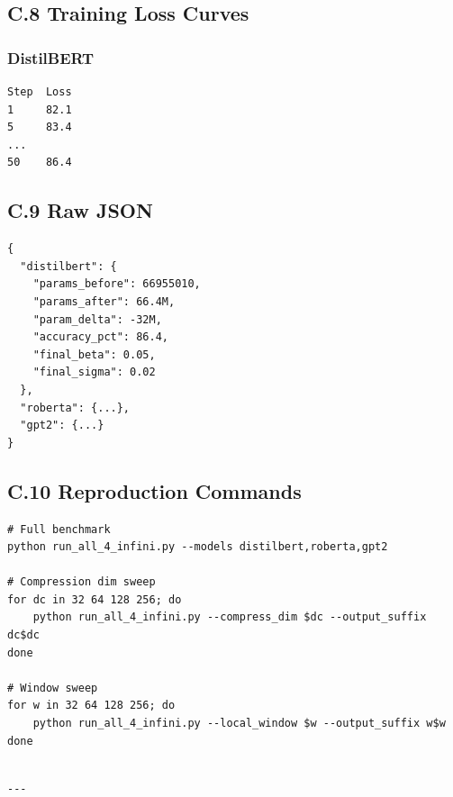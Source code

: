 \subsection{C.8 Training Loss Curves}

\subsubsection{DistilBERT}
\begin{lstlisting}
Step  Loss
1     82.1
5     83.4
...
50    86.4
\end{lstlisting}

\subsection{C.9 Raw JSON}

\begin{lstlisting}
{
  "distilbert": {
    "params_before": 66955010,
    "params_after": 66.4M,
    "param_delta": -32M,
    "accuracy_pct": 86.4,
    "final_beta": 0.05,
    "final_sigma": 0.02
  },
  "roberta": {...},
  "gpt2": {...}
}
\end{lstlisting}

\subsection{C.10 Reproduction Commands}

\begin{lstlisting}
# Full benchmark
python run_all_4_infini.py --models distilbert,roberta,gpt2

# Compression dim sweep
for dc in 32 64 128 256; do
    python run_all_4_infini.py --compress_dim $dc --output_suffix dc$dc
done

# Window sweep
for w in 32 64 128 256; do
    python run_all_4_infini.py --local_window $w --output_suffix w$w
done
\end{lstlisting}
\begin{lstlisting}

---
\end{lstlisting}
